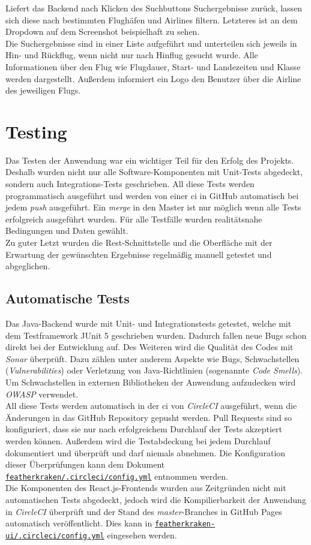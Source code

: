\documentclass[12pt,twoside,a4paper]{article}
\begin{document}
\begin{sloppypar}
Liefert das Backend nach Klicken des Suchbuttons Suchergebnisse zurück, lassen sich diese nach bestimmten Flughäfen und Airlines filtern. Letzteres ist an dem Dropdown auf dem Screenshot beispielhaft zu sehen.\\
Die Suchergebnisse sind in einer Liste aufgeführt und unterteilen sich jeweils in Hin- und Rückflug, wenn nicht nur nach Hinflug gesucht wurde. Alle Informationen über den Flug wie Flugdauer, Start- und Landezeiten und Klasse werden dargestellt. Außerdem informiert ein Logo den Benutzer über die Airline des jeweiligen Flugs.
\newpage
\section{Testing}
Das Testen der Anwendung war ein wichtiger Teil für den Erfolg des Projekts. Deshalb wurden nicht nur alle Software-Komponenten mit Unit-Tests abgedeckt, sondern auch Integrations-Tests geschrieben. All diese Tests werden programmatisch ausgeführt und werden von einer \acrshort{ci} in GitHub automatisch bei jedem \textit{push} ausgeführt. Ein \textit{merge} in den Master ist nur möglich wenn alle Tests erfolgreich ausgeführt wurden. Für alle Testfälle wurden realitätsnahe Bedingungen und Daten gewählt.\\
Zu guter Letzt wurden die Rest-Schnittstelle und die Oberfläche mit der Erwartung der gewünschten Ergebnisse regelmäßig manuell getestet und abgeglichen.
\subsection{Automatische Tests}
Das Java-Backend wurde mit Unit- und Integrationstests getestet, welche mit dem Testframework JUnit 5 geschrieben wurden. Dadurch fallen neue Bugs schon direkt bei der Entwicklung auf. Des Weiteren wird die Qualität des Codes mit \textit{Sonar} überprüft. Dazu zählen unter anderem Aspekte wie Bugs, Schwachstellen (\textit{Vulnerabilities}) oder Verletzung von Java-Richtlinien (sogenannte \textit{Code Smells}). Um Schwachstellen in externen Bibliotheken der Anwendung aufzudecken wird \textit{OWASP} verwendet.\\
All diese Tests werden automatisch in der \acrfull{ci} von \textit{CircleCI} ausgeführt, wenn die Änderungen in das GitHub Repository gepusht werden. Pull Requests sind so konfiguriert, dass sie nur nach erfolgreichem Durchlauf der Tests akzeptiert werden können. Außerdem wird die Testabdeckung bei jedem Durchlauf dokumentiert und überprüft und darf niemals abnehmen. Die Konfiguration dieser Überprüfungen kann dem Dokument \href{https://github.com/featherkraken/featherkraken/blob/master/.circleci/config.yml}{\texttt{featherkraken/.circleci/config.yml}} entnommen werden.\\
Die Komponenten des React.js-Frontends wurden aus Zeitgründen nicht mit automatischen Tests abgedeckt, jedoch wird die Kompilierbarkeit der Anwendung in \textit{CircleCI} überprüft und der Stand des \textit{master}-Branches in GitHub Pages automatisch veröffentlicht. Dies kann in \href{https://github.com/featherkraken/featherkraken-ui/blob/master/.circleci/config.yml}{\texttt{featherkraken-ui/.circleci/config.yml}} eingesehen werden.

\end{sloppypar}
\end{document}
